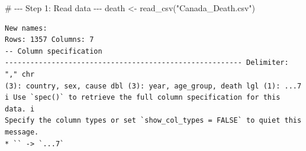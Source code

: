 \documentclass[
  letterpaper,
  DIV=11,
  numbers=noendperiod]{scrartcl}
\newenvironment{Shaded}{\begin{snugshade}}{\end{snugshade}}
\newcommand{\CommentTok}[1]{\textcolor[rgb]{0.37,0.37,0.37}{#1}}
\newcommand{\FunctionTok}[1]{\textcolor[rgb]{0.28,0.35,0.67}{#1}}
\newcommand{\NormalTok}[1]{\textcolor[rgb]{0.00,0.23,0.31}{#1}}
\newcommand{\OtherTok}[1]{\textcolor[rgb]{0.00,0.23,0.31}{#1}}
\newcommand{\StringTok}[1]{\textcolor[rgb]{0.13,0.47,0.30}{#1}}
\begin{document}
\begin{Shaded}
\begin{Highlighting}[]
\CommentTok{\# {-}{-}{-} Step 1: Read data {-}{-}{-}}
\NormalTok{death }\OtherTok{\textless{}{-}} \FunctionTok{read\_csv}\NormalTok{(}\StringTok{"Canada\_Death.csv"}\NormalTok{)}
\end{Highlighting}
\end{Shaded}

\begin{verbatim}
New names:
Rows: 1357 Columns: 7
-- Column specification
-------------------------------------------------------- Delimiter: "," chr
(3): country, sex, cause dbl (3): year, age_group, death lgl (1): ...7
i Use `spec()` to retrieve the full column specification for this data. i
Specify the column types or set `show_col_types = FALSE` to quiet this message.
* `` -> `...7`
\end{verbatim}
\end{document}
